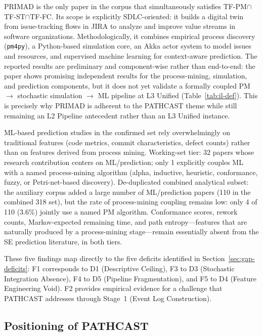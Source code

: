 \begin{description}
PRIMAD is the only paper in the corpus that simultaneously satisfies
TF-PM$\cap$TF-ST$\cap$TF-FC. Its scope is explicitly SDLC-oriented: it builds a
digital twin from issue-tracking flows in JIRA to analyze and improve value
streams in software organizations. Methodologically, it combines empirical
process discovery (\texttt{pm4py}), a Python-based simulation core, an Akka
actor system to model issues and resources, and supervised machine learning
for context-aware prediction. The reported results are preliminary and
component-wise rather than end-to-end: the paper shows promising independent
results for the process-mining, simulation, and prediction components, but it
does not yet validate a formally coupled PM $\rightarrow$ stochastic
simulation $\rightarrow$ ML pipeline at L3 Unified
(Table~\ref{tab:il-def}).
This is precisely why PRIMAD is adherent to the PATHCAST theme while still
remaining an L2 Pipeline antecedent rather than an L3 Unified instance.

\item[F5: Process-Derived Features Unexplored.]
ML-based prediction studies in the confirmed set rely overwhelmingly on
traditional features (code metrics, commit characteristics, defect counts)
rather than on features derived from process mining. Working-set tier: 32
papers whose research contribution centers on ML/prediction; only 1
explicitly couples ML with a named process-mining algorithm (alpha,
inductive, heuristic, conformance, fuzzy, or Petri-net-based discovery).
De-duplicated combined analytical subset: the auxiliary corpus added a large number of ML/prediction
papers (110 in the combined 318 set), but the rate of process-mining
coupling remains low: only 4 of 110 (3.6\%) jointly use a named PM
algorithm. Conformance scores, rework counts, Markov-expected remaining
time, and path entropy---features that are naturally produced by a
process-mining stage---remain essentially absent from the SE prediction
literature, in both tiers.

\end{description}

These five findings map directly to the five deficits identified in
Section~\ref{sec:gap-deficits}: F1 corresponds to D1 (Descriptive Ceiling),
F3 to D3 (Stochastic Integration Absence), F4 to D5 (Pipeline Fragmentation),
and F5 to D4 (Feature Engineering Void). F2 provides empirical evidence for a
challenge that PATHCAST addresses through Stage~1 (Event Log Construction).


\subsection{Positioning of PATHCAST}
\label{sec:slr-positioning}


